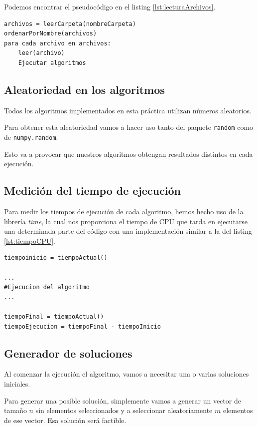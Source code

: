 Podemos encontrar el pseudocódigo en el listing \ref{lst:lecturaArchivos}.

\begin{lstlisting}[frame=single, caption={Versión búsqueda local}, captionpos=b, label=lst:lecturaArchivos]
archivos = leerCarpeta(nombreCarpeta)
ordenarPorNombre(archivos)
para cada archivo en archivos:
    leer(archivo)
    Ejecutar algoritmos
\end{lstlisting}


\subsection{Aleatoriedad en los algoritmos}

Todos los algoritmos implementados en esta práctica utilizan números aleatorios.

Para obtener esta aleatoriedad vamos a hacer uso tanto del paquete \texttt{random} como de \texttt{numpy.random}.

Esto va a provocar que nuestros algoritmos obtengan resultados distintos en cada ejecución.

\subsection{Medición del tiempo de ejecución}

Para medir los tiempos de ejecución de cada algoritmo, hemos hecho uso de la librería \textit{time}, la cual nos proporciona el tiempo de CPU que tarda en ejecutarse una determinada parte del código con una implementación similar a la del listing \ref{lst:tiempoCPU}.

\begin{lstlisting}[frame=single, caption={Tiempo de ejecución de un programa}, captionpos=b, label=lst:tiempoCPU]
tiempoinicio = tiempoActual()

...
#Ejecucion del algoritmo
...

tiempoFinal = tiempoActual()
tiempoEjecucion = tiempoFinal - tiempoInicio
\end{lstlisting}

\subsection{Generador de soluciones}

Al comenzar la ejecución el algoritmo, vamos a necesitar una o varias soluciones iniciales.

Para generar una posible solución, simplemente vamos a generar un vector de tamaño $n$ sin elementos seleccionados y a seleccionar aleatoriamente $m$ elementos de ese vector.
Esa solución será factible.

